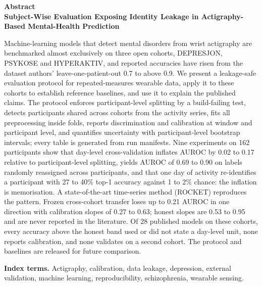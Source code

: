 \documentclass[11pt,a4paper]{article}
\begin{document}
\begin{center}
{\large\bfseries Abstract}\\[1.0em]
{\Large\bfseries Subject-Wise Evaluation Exposing Identity Leakage in Actigraphy-Based Mental-Health Prediction}\\[1.2em]
\end{center}
Machine-learning models that detect mental disorders from wrist actigraphy are benchmarked almost exclusively on three open cohorts, DEPRESJON, PSYKOSE and HYPERAKTIV, and reported accuracies have risen from the dataset authors' leave-one-patient-out 0.7 to above 0.9. We present a leakage-safe evaluation protocol for repeated-measures wearable data, apply it to these cohorts to establish reference baselines, and use it to explain the published claims. The protocol enforces participant-level splitting by a build-failing test, detects participants shared across cohorts from the activity series, fits all preprocessing inside folds, reports discrimination and calibration at window and participant level, and quantifies uncertainty with participant-level bootstrap intervals; every table is generated from run manifests. Nine experiments on 162 participants show that day-level cross-validation inflates AUROC by 0.02 to 0.17 relative to participant-level splitting, yields AUROC of 0.69 to 0.90 on labels randomly reassigned across participants, and that one day of activity re-identifies a participant with 27 to 40\% top-1 accuracy against 1 to 2\% chance: the inflation is memorisation. A state-of-the-art time-series method (ROCKET) reproduces the pattern. Frozen cross-cohort transfer loses up to 0.21 AUROC in one direction with calibration slopes of 0.27 to 0.63; honest slopes are 0.53 to 0.95 and are never reported in the literature. Of 28 published models on these cohorts, every accuracy above the honest band used or did not state a day-level unit, none reports calibration, and none validates on a second cohort. The protocol and baselines are released for future comparison.

\vspace{0.8em}\textbf{Index terms.} Actigraphy, calibration, data leakage, depression, external validation, machine learning, reproducibility, schizophrenia, wearable sensing.
\end{document}
